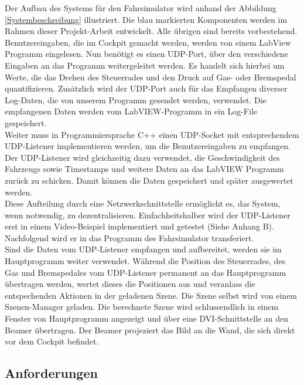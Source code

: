 Der Aufbau des Systems für den Fahrsimulator wird anhand der Abbildung \ref{Systembeschreibung} illustriert. Die blau markierten Komponenten werden im Rahmen dieser Projekt-Arbeit entwickelt. Alle übrigen sind bereits vorbestehend. \\
Benutzereingaben, die im Cockpit gemacht werden, werden von einem LabView Programm eingelesen. Nun benötigt es einen UDP-Port,  über den verschiedene Eingaben an das Programm weitergeleitet werden. Es handelt sich hierbei um Werte, die das Drehen des Steuerrades und den Druck auf Gas- oder Bremspedal quantifizieren. Zusätzlich wird der UDP-Port auch für das Empfangen diverser Log-Daten, die von unserem Programm gesendet werden, verwendet. Die empfangenen Daten werden vom LabVIEW-Programm  in ein Log-File gespeichert.\\
Weiter  muss in Programmiersprache C++ einen UDP-Socket mit entsprechendem UDP-Listener implementieren werden, um die Benutzereingaben zu empfangen. Der UDP-Listener wird gleichzeitig dazu verwendet, die Geschwindigkeit des Fahrzeugs sowie Timestamps und weitere Daten an das LabVIEW Programm zurück zu schicken. Damit können die Daten gespeichert und später ausgewertet werden.\\
Diese Aufteilung durch eine Netzwerkschnittstelle ermöglicht es,  das System, wenn notwendig, zu dezentralisieren. Einfachheitshalber wird der UDP-Listener erst in einem Video-Beispiel implementiert und getestet (Siehe Anhang B). Nachfolgend wird er in das Programm des Fahrsimulator transferiert.\\
Sind die Daten vom UDP-Listener empfangen und aufbereitet, werden sie im Hauptprogramm weiter verwendet. Während die Position des Steuerrades, des Gas und Bremspedales vom UDP-Listener permanent an das Hauptprogramm übertragen werden, wertet dieses die Positionen aus und veranlass die entspechenden Aktionen in der geladenen Szene. 
Die Szene selbst wird von einem Szenen-Manager geladen. Die berechnete Szene wird schlussendlich in einem Fenster von Hauptprogramm angezeigt und über eine DVI-Schnittstelle an den Beamer übertragen. Der Beamer projeziert das Bild an die Wand, die sich direkt vor dem Cockpit befindet. 

\subsection{Anforderungen}
